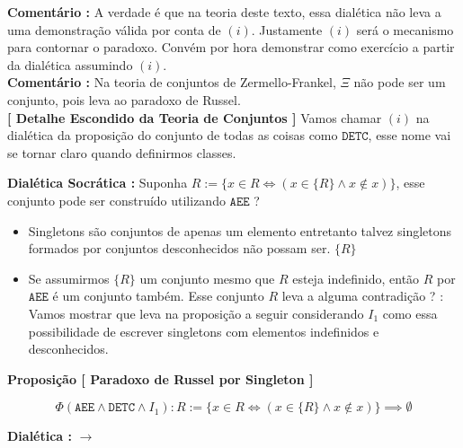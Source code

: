 \documentclass[10pt,a4paper]{report}
\begin{document}
\textbf{Comentário :} A verdade é que na teoria deste texto, essa dialética não leva a uma demonstração válida por conta de $(i)$. Justamente $(i)$ será o mecanismo para contornar o paradoxo. Convém por hora demonstrar como exercício a partir da dialética assumindo $(i)$.\\

\textbf{Comentário :} Na teoria de conjuntos de Zermello-Frankel, $\Xi$ não pode ser um conjunto, pois leva ao paradoxo de Russel.\\

\textbf{[ Detalhe Escondido da Teoria de Conjuntos ]} Vamos chamar $(i)$ na dialética da proposição do conjunto de todas as coisas como $\texttt{DETC}$, esse nome vai se tornar claro quando definirmos classes.

% 
\hspace{\baselineskip}

\textbf{Dialética Socrática :} Suponha $ R:= \{ x \in R \iff ( x \in \{R\} \wedge x \notin x ) \} $, esse conjunto pode ser construído utilizando $\texttt{AEE}$ ?

\begin{itemize}
	\item[ (1) ] Singletons são conjuntos de apenas um elemento entretanto talvez singletons formados por conjuntos desconhecidos não possam ser. $\{ R \}$
	\item[ (2) ] Se assumirmos $\{R\}$ um conjunto mesmo que $R$ esteja indefinido, então $R$ por $\texttt{AEE} $ é um conjunto também. Esse conjunto $R$ leva a alguma contradição ? : Vamos mostrar que leva na proposição a seguir considerando $ I_1 $ como essa possibilidade de escrever singletons com elementos indefinidos e desconhecidos.
\end{itemize}


\textbf{Proposição [ Paradoxo de Russel por Singleton ]}

$$ \Phi( \texttt{AEE} \wedge \texttt{DETC} \wedge I_1 ) : R := \{ x \in R \iff ( x \in \{R\} \wedge x \notin x ) \} \implies \emptyset $$

\textbf{Dialética :} $\rightarrow$ 
\end{document}
